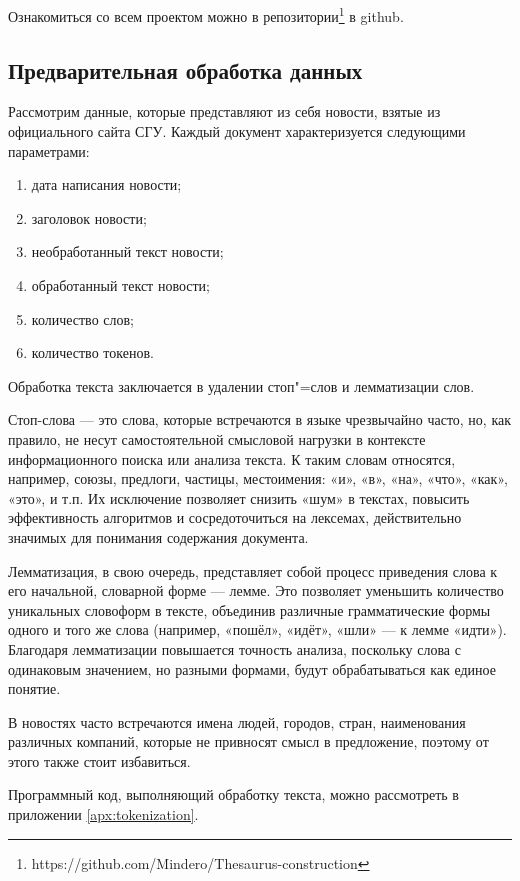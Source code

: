 \documentclass[coursework]{SCWorks}
\begin{document}
Ознакомиться со всем проектом можно в репозитории\footnote{https://github.com/Mindero/Thesaurus-construction} в github.
\subsection{Предварительная обработка данных}
Рассмотрим данные, которые представляют из себя новости, взятые из официального сайта СГУ. Каждый документ характеризуется следующими параметрами:
\begin{enumerate}
  \item дата написания новости;
  \item заголовок новости;
  \item необработанный текст новости;
  \item обработанный текст новости;
  \item количество слов;
  \item количество токенов.
\end{enumerate}

Обработка текста заключается в удалении стоп"=слов и лемматизации слов.

Стоп-слова — это слова, которые встречаются в языке чрезвычайно часто, но, как правило, не несут самостоятельной смысловой нагрузки в контексте информационного поиска или анализа текста. К таким словам относятся, например, союзы, предлоги, частицы, местоимения: «и», «в», «на», «что», «как», «это», и т.п. Их исключение позволяет снизить «шум» в текстах, повысить эффективность алгоритмов и сосредоточиться на лексемах, действительно значимых для понимания содержания документа.
  
Лемматизация, в свою очередь, представляет собой процесс приведения слова к его начальной, словарной форме — лемме. Это позволяет уменьшить количество уникальных словоформ в тексте, объединив различные грамматические формы одного и того же слова (например, «пошёл», «идёт», «шли» — к лемме «идти»). Благодаря лемматизации повышается точность анализа, поскольку слова с одинаковым значением, но разными формами, будут обрабатываться как единое понятие.

В новостях часто встречаются имена людей, городов, стран, наименования различных компаний, которые не привносят смысл в предложение, поэтому от этого также стоит избавиться.

Программный код, выполняющий обработку текста, можно рассмотреть в приложении \ref{apx:tokenization}.
\end{document}
